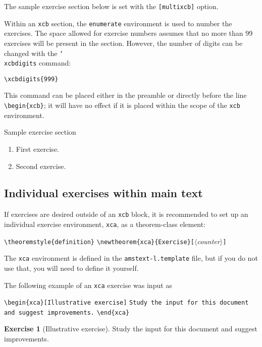 \documentclass[multixcb]{amstext-l}
\theoremstyle{plain}
\theoremstyle{definition}
\newtheorem{xca}{Exercise}[section]
\newcommand{\cs}[1]{\texttt{\char`\\#1}}
\def\<#1>{$\langle$\textit{#1}$\rangle$}
\newenvironment{exm}{%
  \par
  \begingroup
    \parindent0pt
    \leftskip2\normalparindent
    \obeylines
}{%
    \par
  \endgroup
}
\begin{document}
The sample exercise section below is set with the \texttt{[multixcb]}
option.

Within an \texttt{xcb} section, the \texttt{enumerate} environment
is used to number the exercises.  The space allowed for exercise
numbers assumes that no more than 99 exercises will be present in
the section.  However, the number of digits can be changed with
the \cs{xcbdigits} command:
\begin{exm}
\verb+\xcbdigits{999}+
\end{exm}
\noindent
This command can be placed either in the preamble or directly before
the line \verb+\begin{xcb}+; it will have no effect if it is placed
within the scope of the \texttt{xcb} environment.

\begin{xcb}{Sample exercise section}

\begin{enumerate}
\item First exercise.
\item Second exercise.
\end{enumerate}

\end{xcb}

\subsection{Individual exercises within main text}

If exercises are desired outside of an \texttt{xcb} block,
it is recommended to set up an individual exercise environment,
\texttt{xca}, as a theorem-class element:
\begin{exm}
\verb+\theoremstyle{definition}+
\verb+\newtheorem{xca}{Exercise}[+\<\textit{counter}>\verb+]+
\end{exm}
\noindent
The \texttt{xca} environment is defined in the \texttt{amstext-l.template}
file, but if you do not use that, you will need to define it yourself.

The following example of an \texttt{xca} exercise was input as
\begin{exm}
\verb+\begin{xca}[Illustrative exercise]+
\texttt{Study the input for this document and suggest improvements.}
\verb+\end{xca}+
\end{exm}

\begin{xca}[Illustrative exercise]
Study the input for this document and suggest improvements.
\end{xca}
\end{document}
